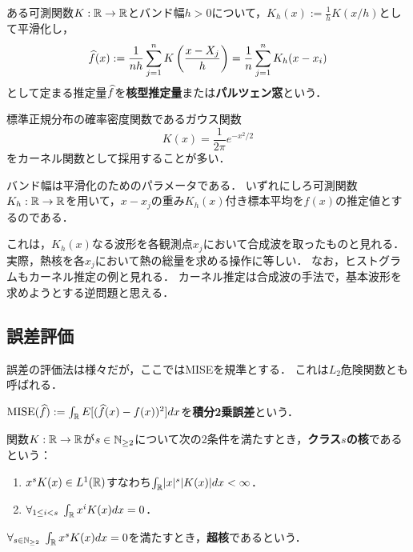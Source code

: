 \documentclass[uplatex,dvipdfmx]{jsreport}
\begin{document}
\begin{definition}
    ある可測関数$K:\mathbb{R}\to\mathbb{R}$とバンド幅$h>0$について，$K_h(x):=\frac{1}{h}K(x/h)$として平滑化し，
    \[\widehat{f}(x):=\frac{1}{nh}\sum^n_{j=1}K\left(\frac{x-X_j}{h}\right)=\frac{1}{n}\sum^n_{j=1}K_h(x-x_i)\]
    として定まる推定量$\widehat{f}$を\textbf{核型推定量}または\textbf{パルツェン窓}という．
\end{definition}
\begin{example}
    標準正規分布の確率密度関数であるガウス関数
    \[K(x)=\frac{1}{2\pi}e^{-x^2/2}\]
    をカーネル関数として採用することが多い．
\end{example}
\begin{remarks}
    バンド幅は平滑化のためのパラメータである．
    いずれにしろ可測関数$K_h:\mathbb{R}\to\mathbb{R}$を用いて，$x-x_j$の重み$K_h(x)$付き標本平均を$f(x)$の推定値とするのである．

    これは，$K_h(x)$なる波形を各観測点$x_j$において合成波を取ったものと見れる．実際，熱核を各$x_j$において熱の総量を求める操作に等しい．
    なお，ヒストグラムもカーネル推定の例と見れる．
    カーネル推定は合成波の手法で，基本波形を求めようとする逆問題と思える．
\end{remarks}

\subsection{誤差評価}

\begin{tcolorbox}[colframe=ForestGreen, colback=ForestGreen!10!white,breakable,colbacktitle=ForestGreen!40!white,coltitle=black,fonttitle=\bfseries\sffamily,
title=]
    誤差の評価法は様々だが，ここではMISEを規準とする．
    これは$L_2$危険関数とも呼ばれる．
\end{tcolorbox}

\begin{definition}
    $\mathrm{MISE}(\widehat{f}):=\int_{\mathbb{R}} E[(\widehat{f}(x)-f(x))^2]dx$を\textbf{積分2乗誤差}という．
\end{definition}

\begin{definition}
    関数$K:\mathbb{R}\to\mathbb{R}$が$s\in\mathbb{N}_{\ge2}$について次の2条件を満たすとき，\textbf{クラス$s$の核}であるという：
    \begin{enumerate}
        \item $x^sK(x)\in L^1(\mathbb{R})$すなわち$\int_{\mathbb{R}}\lvert x\rvert^s\lvert K(x)\rvert dx<\infty$．
        \item $\forall_{1\le i<s}\;\int_{\mathbb{R}} x^iK(x)dx=0$．
    \end{enumerate}
    $\forall_{s\in\mathbb{N}_{\ge2}}\;\int_{\mathbb{R}} x^sK(x)dx=0$を満たすとき，\textbf{超核}であるという．
\end{definition}
\end{document}
